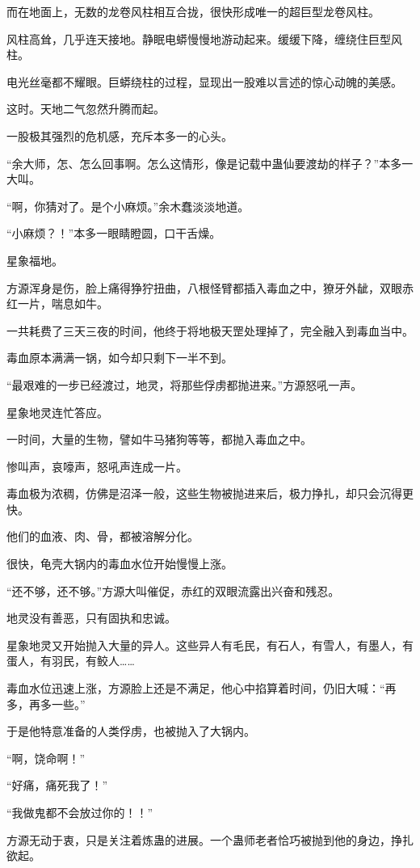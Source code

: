 \begin{this_body}
而在地面上，无数的龙卷风柱相互合拢，很快形成唯一的超巨型龙卷风柱。

风柱高耸，几乎连天接地。静眠电蟒慢慢地游动起来。缓缓下降，缠绕住巨型风柱。

电光丝毫都不耀眼。巨蟒绕柱的过程，显现出一股难以言述的惊心动魄的美感。

这时。天地二气忽然升腾而起。

一股极其强烈的危机感，充斥本多一的心头。

“余大师，怎、怎么回事啊。怎么这情形，像是记载中蛊仙要渡劫的样子？”本多一大叫。

“啊，你猜对了。是个小麻烦。”余木蠢淡淡地道。

“小麻烦？！”本多一眼睛瞪圆，口干舌燥。

星象福地。

方源浑身是伤，脸上痛得狰狞扭曲，八根怪臂都插入毒血之中，獠牙外龇，双眼赤红一片，喘息如牛。

一共耗费了三天三夜的时间，他终于将地极天罡处理掉了，完全融入到毒血当中。

毒血原本满满一锅，如今却只剩下一半不到。

“最艰难的一步已经渡过，地灵，将那些俘虏都抛进来。”方源怒吼一声。

星象地灵连忙答应。

一时间，大量的生物，譬如牛马猪狗等等，都抛入毒血之中。

惨叫声，哀嚎声，怒吼声连成一片。

毒血极为浓稠，仿佛是沼泽一般，这些生物被抛进来后，极力挣扎，却只会沉得更快。

他们的血液、肉、骨，都被溶解分化。

很快，龟壳大锅内的毒血水位开始慢慢上涨。

“还不够，还不够。”方源大叫催促，赤红的双眼流露出兴奋和残忍。

地灵没有善恶，只有固执和忠诚。

星象地灵又开始抛入大量的异人。这些异人有毛民，有石人，有雪人，有墨人，有蛋人，有羽民，有鲛人……

毒血水位迅速上涨，方源脸上还是不满足，他心中掐算着时间，仍旧大喊：“再多，再多一些。”

于是他特意准备的人类俘虏，也被抛入了大锅内。

“啊，饶命啊！”

“好痛，痛死我了！”

“我做鬼都不会放过你的！！”

方源无动于衷，只是关注着炼蛊的进展。一个蛊师老者恰巧被抛到他的身边，挣扎欲起。


\end{this_body}
